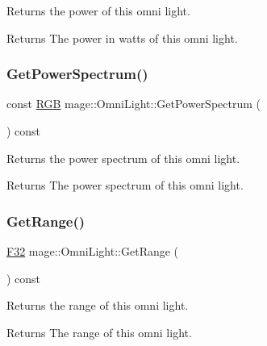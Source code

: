 Returns the power of this omni light.

\begin{DoxyReturn}{Returns}
The power in watts of this omni light. 
\end{DoxyReturn}
\hypertarget{classmage_1_1_omni_light_a17a0de3d22bfd3dcb2480f516009d885}{}\label{classmage_1_1_omni_light_a17a0de3d22bfd3dcb2480f516009d885} 
\subsubsection{\texorpdfstring{Get\+Power\+Spectrum()}{GetPowerSpectrum()}}
{\footnotesize\ttfamily const \hyperlink{structmage_1_1_r_g_b}{R\+GB} mage\+::\+Omni\+Light\+::\+Get\+Power\+Spectrum (\begin{DoxyParamCaption}{ }\end{DoxyParamCaption}) const\hspace{0.3cm}{\ttfamily [noexcept]}}

Returns the power spectrum of this omni light.

\begin{DoxyReturn}{Returns}
The power spectrum of this omni light. 
\end{DoxyReturn}
\hypertarget{classmage_1_1_omni_light_a1c829777c2afc850dd66382bc0115d8d}{}\label{classmage_1_1_omni_light_a1c829777c2afc850dd66382bc0115d8d} 
\subsubsection{\texorpdfstring{Get\+Range()}{GetRange()}}
{\footnotesize\ttfamily \hyperlink{namespacemage_aa97e833b45f06d60a0a9c4fc22ae02c0}{F32} mage\+::\+Omni\+Light\+::\+Get\+Range (\begin{DoxyParamCaption}{ }\end{DoxyParamCaption}) const\hspace{0.3cm}{\ttfamily [noexcept]}}

Returns the range of this omni light.

\begin{DoxyReturn}{Returns}
The range of this omni light. 
\end{DoxyReturn}
\hypertarget{classmage_1_1_omni_light_a3efda1559769189e4693c6e3c570ab4b}{}\label{classmage_1_1_omni_light_a3efda1559769189e4693c6e3c570ab4b} 
